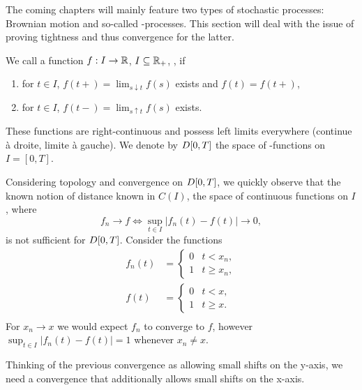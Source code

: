 The coming chapters will mainly feature two types of stochastic processes:
Brownian motion and so-called \cadlag-processes.
This section will deal with the issue of proving tightness and thus convergence for the latter.

\begin{definition} \label{D: DT}
	We call a function $f: I \rightarrow \mathbb{R}$, $I \subseteq \mathbb{R}_+$, \emph{\cadlag},
	if
	\begin{enumerate}
		\item for $t \in I$, $f(t+) = \lim_{s \downarrow t}f(s)$ exists and $f(t) = f(t+)$,
		\item for $t \in I$, $f(t-) = \lim_{s \uparrow t}f(s)$ exists.
	\end{enumerate}
	These functions are right-continuous and possess left limits everywhere (continue à droite, limite à gauche).
	We denote by $D[0, T]$ the space of \cadlag-functions on $I = [0,T]$.
\end{definition}

Considering topology and convergence on $D[0, T]$, 
we quickly observe that the known notion of distance known in $C(I)$,
the space of continuous functions on $I$,
where
\begin{equation}
	f_n \rightarrow f \iff \sup_{t \in I} |f_n(t) - f(t)| \rightarrow 0,
\end{equation}
is not sufficient for $D[0, T]$.
Consider the functions
\begin{equation}
	\begin{aligned}
	f_n(t) &= 
		\begin{cases} 
		0 & t < x_n, \\
		1 & t \geq x_n, 
		\end{cases} \\
	f(t) &= 
		\begin{cases} 
		0 & t < x, \\
		1 & t \geq x.
		\end{cases} \\
	\end{aligned}
\end{equation}
For $x_n \rightarrow x$ we would expect $f_n$ to converge to $f$,
however $\sup_{t \in I}|f_n(t) - f(t)| = 1$ whenever $x_n \neq x$.

Thinking of the previous convergence as allowing small shifts on the y-axis,
we need a convergence that additionally allows small shifts on the x-axis.

